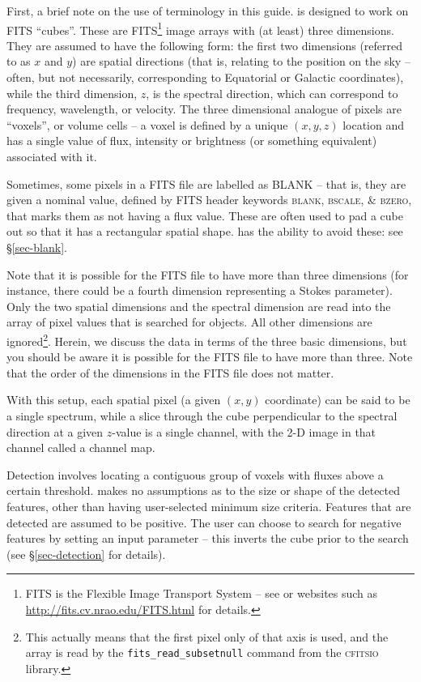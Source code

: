 
First, a brief note on the use of terminology in this guide. \duchamp
is designed to work on FITS ``cubes''. These are FITS\footnote{FITS is
the Flexible Image Transport System -- see \citet{hanisch01} or
websites such as
\href{http://fits.cv.nrao.edu/FITS.html}{http://fits.cv.nrao.edu/FITS.html}
for details.} image arrays with (at least) three dimensions. They
are assumed to have the following form: the first two dimensions
(referred to as $x$ and $y$) are spatial directions (that is, relating
to the position on the sky -- often, but not necessarily,
corresponding to Equatorial or Galactic coordinates), while the third
dimension, $z$, is the spectral direction, which can correspond to
frequency, wavelength, or velocity. The three dimensional analogue of
pixels are ``voxels'', or volume cells -- a voxel is defined by a
unique $(x,y,z)$ location and has a single value of flux, intensity
or brightness (or something equivalent) associated with it.

Sometimes, some pixels in a FITS file are labelled as BLANK -- that
is, they are given a nominal value, defined by FITS header keywords
\textsc{blank, bscale, \& bzero}, that marks them as not having a flux
value. These are often used to pad a cube out so that it has a
rectangular spatial shape. \duchamp has the ability to avoid these:
see \S\ref{sec-blank}.

Note that it is possible for the FITS file to have more than three
dimensions (for instance, there could be a fourth dimension
representing a Stokes parameter). Only the two spatial dimensions and
the spectral dimension are read into the array of pixel values that is
searched for objects. All other dimensions are ignored\footnote{This
actually means that the first pixel only of that axis is used, and the
array is read by the \texttt{fits\_read\_subsetnull} command from the
\textsc{cfitsio} library.}. Herein, we discuss the data in terms of
the three basic dimensions, but you should be aware it is possible for
the FITS file to have more than three. Note that the order of the
dimensions in the FITS file does not matter.

With this setup, each spatial pixel (a given $(x,y)$ coordinate) can
be said to be a single spectrum, while a slice through the cube
perpendicular to the spectral direction at a given $z$-value is a
single channel, with the 2-D image in that channel called a channel
map.

Detection involves locating a contiguous group of voxels with fluxes
above a certain threshold. \duchamp makes no assumptions as to the
size or shape of the detected features, other than having
user-selected minimum size criteria. Features that are detected are
assumed to be positive. The user can choose to search for negative
features by setting an input parameter -- this inverts the cube prior
to the search (see \S\ref{sec-detection} for details).

